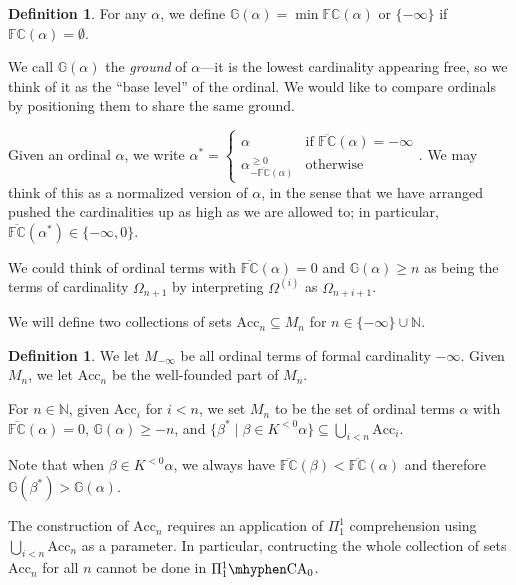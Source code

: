 \documentclass[11pt]{amsart}
\theoremstyle{definition}
\newtheorem{definition}[theorem]{Definition}
\begin{document}
\begin{definition}
  For any $\alpha$, we define $\mathbb{G}(\alpha)=\min\mathbb{FC}(\alpha)$ or $\{-\infty\}$ if $\mathbb{FC}(\alpha)=\emptyset$.
\end{definition}
We call $\mathbb{G}(\alpha)$ the \emph{ground} of $\alpha$---it is the lowest cardinality appearing free, so we think of it as the ``base level'' of the ordinal. We would like to compare ordinals by positioning them to share the same ground.

Given an ordinal $\alpha$, we write $\alpha^*=\left\{\begin{array}{ll}\alpha&\text{if }\overline{\mathbb{FC}}(\alpha)=-\infty\\\alpha^{\geq 0}_{-\overline{\mathbb{FC}}(\alpha)}&\text{otherwise}\end{array}\right.$. We may think of this as a normalized version of $\alpha$, in the sense that we have arranged pushed the cardinalities up as high as we are allowed to; in particular, $\overline{\mathbb{FC}}(\alpha^*)\in\{-\infty,0\}$.

We could think of ordinal terms with $\overline{\mathbb{FC}}(\alpha)=0$ and $\mathbb{G}(\alpha)\geq n$ as being the terms of cardinality $\Omega_{n+1}$ by interpreting $\Omega^{(i)}$ as $\Omega_{n+i+1}$.

We will define two collections of sets $\mathrm{Acc}_n\subseteq M_n$ for $n\in\{-\infty\}\cup \mathbb{N}$.
\begin{definition}
  We let $M_{-\infty}$ be all ordinal terms of formal cardinality $-\infty$. Given $M_n$, we let $\mathrm{Acc}_n$ be the well-founded part of $M_n$.

  For $n\in\mathbb{N}$, given $\mathrm{Acc}_i$ for $i<n$, we set $M_n$ to be the set of ordinal terms $\alpha$ with $\overline{\mathbb{FC}}(\alpha)=0$, $\mathbb{G}(\alpha)\geq -n$, and $\{\beta^*\mid \beta\in K^{< 0}\alpha\}\subseteq\bigcup_{i<n}\mathrm{Acc}_i$.
\end{definition}
Note that when $\beta\in K^{< 0}\alpha$, we always have $\overline{\mathbb{FC}}(\beta)<\overline{\mathbb{FC}}(\alpha)$ and therefore $\mathbb{G}(\beta^*)>\mathbb{G}(\alpha)$.%

The construction of $\mathrm{Acc}_n$ requires an application of $\Pi^1_1$ comprehension using $\bigcup_{i<n}\mathrm{Acc}_n$ as a parameter. In particular, contructing the whole collection of sets $\mathrm{Acc}_n$ for all $n$ cannot be done in $\Pi^1_1\mhyphen\mathrm{CA}_0$.
\end{document}
